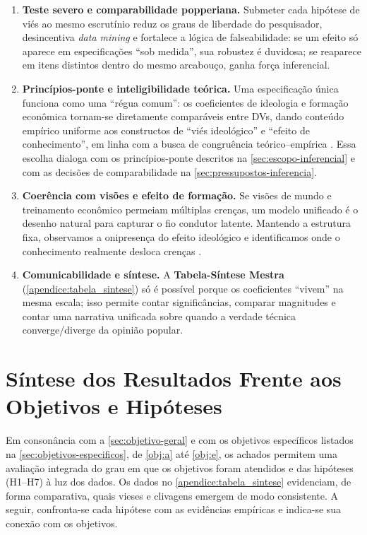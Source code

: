 \begin{enumerate}[label=\roman*)]
\item \textbf{Teste severo e comparabilidade popperiana.} Submeter cada hipótese de viés ao mesmo escrutínio reduz os graus de liberdade do pesquisador, desincentiva \emph{data mining} e fortalece a lógica de falseabilidade: se um efeito só aparece em especificações “sob medida”, sua robustez é duvidosa; se reaparece em itens distintos dentro do mesmo arcabouço, ganha força inferencial.

\item \textbf{Princípios-ponte e inteligibilidade teórica.} Uma especificação única funciona como uma “régua comum”: os coeficientes de ideologia e formação econômica tornam-se diretamente comparáveis entre DVs, dando conteúdo empírico uniforme aos constructos de “viés ideológico” e “efeito de conhecimento”, em linha com a busca de congruência teórico–empírica \cite{stigum2003}. Essa escolha dialoga com os princípios-ponte descritos na \autoref{sec:escopo-inferencial} e com as decisões de comparabilidade na \autoref{sec:pressupostos-inferencia}.

\item \textbf{Coerência com visões e efeito de formação.} Se visões de mundo e treinamento econômico permeiam múltiplas crenças, um modelo unificado é o desenho natural para capturar o fio condutor latente. Mantendo a estrutura fixa, observamos a onipresença do efeito ideológico e identificamos onde o conhecimento realmente desloca crenças \cite{sowell2007conflict,newman2020ideia}. 

\item \textbf{Comunicabilidade e síntese.} A \textbf{Tabela-Síntese Mestra} (\autoref{apendice:tabela_sintese}) só é possível porque os coeficientes “vivem” na mesma escala; isso permite contar significâncias, comparar magnitudes e contar uma narrativa unificada sobre quando a verdade técnica converge/diverge da opinião popular.
\end{enumerate}

\section{Síntese dos Resultados Frente aos Objetivos e Hipóteses}\label{sec:sintese-resultados}

Em consonância com a \autoref{sec:objetivo-geral} e com os objetivos específicos listados na \autoref{sec:objetivos-especificos}, de \autoref{obj:a} até \autoref{obj:e}, os achados permitem uma avaliação integrada do grau em que os objetivos foram atendidos e das hipóteses (H1–H7) à luz dos dados. Os dados no \autoref{apendice:tabela_sintese} evidenciam, de forma comparativa, quais vieses e clivagens emergem de modo consistente. A seguir, confronta-se cada hipótese com as evidências empíricas e indica-se sua conexão com os objetivos.

